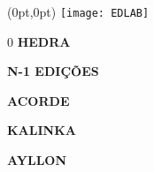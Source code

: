 \begin{textblock*}{5.625in}(0pt,0pt)%
\vspace*{-3cm}
\hspace*{-2.1cm}\texttt{[image: EDLAB]}
\end{textblock*}

\pagebreak

\pagestyle{indice}

{}

\vspace{1.2cm}

{\LARGE

\hspace*{6.8cm}0\pageref{hedra} \textbf{HEDRA}

\hspace*{6.8cm}\pageref{n-1} \textbf{N-1 EDIÇÕES}

\hspace*{6.8cm}\pageref{acorde} \textbf{ACORDE}

\hspace*{6.8cm}\pageref{kalinka} \textbf{KALINKA}

\hspace*{6.8cm}\pageref{ayllon} \textbf{AYLLON}\\






}

